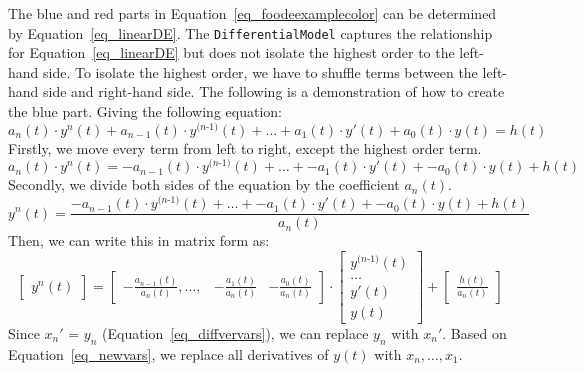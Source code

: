 The blue and red parts in Equation~\ref{eq_foodeexamplecolor} can be determined by Equation~\ref{eq_linearDE}. The \verb|DifferentialModel| captures the relationship for Equation~\ref{eq_linearDE} but does not isolate the highest order to the left-hand side. To isolate the highest order, we have to shuffle terms between the left-hand side and right-hand side. The following is a demonstration of how to create the blue part. Giving the following equation:
\begin{equation}
	a_n(t) \cdot y^n(t) + a_{n-1}(t) \cdot y^{\textit{(n-1)}}(t) + \dots + a_1(t) \cdot y'(t) + a_0(t) \cdot y(t) = h(t) \nonumber
\end{equation}
Firstly, we move every term from left to right, except the highest order term. 
\begin{equation}
	a_n(t) \cdot y^n(t)  = -a_{n-1}(t) \cdot y^{\textit{(n-1)}}(t) + \dots + -a_1(t) \cdot y'(t) + -a_0(t) \cdot y(t) + h(t) \nonumber
\end{equation}
Secondly, we divide both sides of the equation by the coefficient $a_n(t)$.
\begin{equation}
	y^n(t)  = \frac{-a_{n-1}(t) \cdot y^{\textit{(n-1)}}(t) + \dots + -a_1(t) \cdot y'(t) + -a_0(t) \cdot y(t) + h(t)}{a_n(t)} \nonumber
\end{equation}
Then, we can write this in matrix form as:
\begin{equation} 
  \begin{bmatrix}
		y^n(t)
	\end{bmatrix}
  = 
	\begin{bmatrix}
		-\frac{a_{n-1}(t)}{a_n(t)}, \dots, & -\frac{a_{1}(t)}{a_n(t)} & -\frac{a_{0}(t)}{a_n(t)}
	\end{bmatrix}
	\cdot
	\begin{bmatrix}
		y^{\textit{(n-1)}}(t) \\
		\dots \\
    y'(t) \\
		y(t)  
	\end{bmatrix}
	+
	\begin{bmatrix}
		\frac{h(t)}{a_n(t)}
	\end{bmatrix}
  \nonumber
\end{equation}
Since $x_{n}'$ = $y_{n}$ (Equation~\ref{eq_diffvervars}), we can replace $y_{n}$ with $x_{n}'$. Based on Equation~\ref{eq_newvars}, we replace all derivatives of $y(t)$ with $x_{n}, \dots, x_{1}$.

